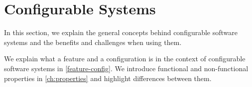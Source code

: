 \section{Configurable Systems}\label{ch:configurable-systems}
\theoremstyle{definition}
\newtheorem{definition}{Definition}[section]

In this section, we explain the general concepts behind configurable software systems and the benefits and challenges when using them. 

We explain what a feature and a configuration is in the context of configurable software systems in \autoref{feature-config}. 
We introduce functional and non-functional properties in \autoref{ch:properties} and highlight differences between them.



